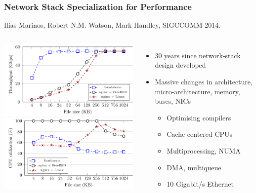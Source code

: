 \begin{frame}
  \frametitle{Network Stack Specialization for Performance}

  Ilias Marinos, Robert N.M. Watson, Mark Handley, SIGCCOMM 2014.

  \smallskip

  \begin{columns}[T]

    \smallskip
    \includegraphics[scale=0.61]{../../figures/throughput_nginx_sandstorm_6nics_new.pdf} \\
    \includegraphics[scale=0.61]{../../figures/cpu_nginx_sandstorm_6nics_new.pdf}


    \pause

    \begin{itemize}
      \item 30 years since network-stack design developed

      \medskip
      \pause

      \item Massive changes in architecture, micro-architecture, memory,
	buses, NICs
      \begin{itemize}
	\item Optimising compilers
	\item Cache-centered CPUs
	\item Multiprocessing, NUMA
	\item DMA, multiqueue
	\item 10 Gigabit/s Ethernet
      \end{itemize}


\end{itemize}
\end{columns}
\end{frame}
